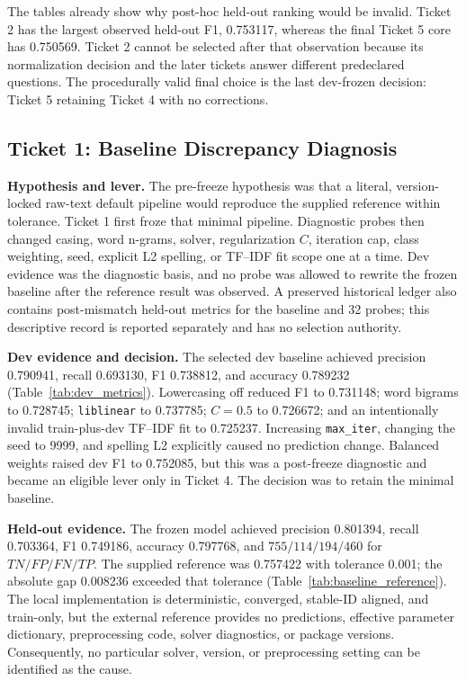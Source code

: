 \documentclass[conference]{IEEEtran}
\begin{document}
The tables already show why post-hoc held-out ranking would be invalid. Ticket 2 has the largest observed held-out F1, 0.753117, whereas the final Ticket 5 core has 0.750569. Ticket 2 cannot be selected after that observation because its normalization decision and the later tickets answer different predeclared questions. The procedurally valid final choice is the last dev-frozen decision: Ticket 5 retaining Ticket 4 with no corrections.

\subsection{Ticket 1: Baseline Discrepancy Diagnosis}

\textbf{Hypothesis and lever.} The pre-freeze hypothesis was that a literal, version-locked raw-text default pipeline would reproduce the supplied reference within tolerance. Ticket 1 first froze that minimal pipeline. Diagnostic probes then changed casing, word n-grams, solver, regularization $C$, iteration cap, class weighting, seed, explicit L2 spelling, or TF--IDF fit scope one at a time. Dev evidence was the diagnostic basis, and no probe was allowed to rewrite the frozen baseline after the reference result was observed. A preserved historical ledger also contains post-mismatch held-out metrics for the baseline and 32 probes; this descriptive record is reported separately and has no selection authority.

\textbf{Dev evidence and decision.} The selected dev baseline achieved precision 0.790941, recall 0.693130, F1 0.738812, and accuracy 0.789232 (Table~\ref{tab:dev_metrics}). Lowercasing off reduced F1 to 0.731148; word bigrams to 0.728745; \texttt{liblinear} to 0.737785; $C=0.5$ to 0.726672; and an intentionally invalid train-plus-dev TF--IDF fit to 0.725237. Increasing \texttt{max\_iter}, changing the seed to 9999, and spelling L2 explicitly caused no prediction change. Balanced weights raised dev F1 to 0.752085, but this was a post-freeze diagnostic and became an eligible lever only in Ticket 4. The decision was to retain the minimal baseline.

\textbf{Held-out evidence.} The frozen model achieved precision 0.801394, recall 0.703364, F1 0.749186, accuracy 0.797768, and $755/114/194/460$ for $TN/FP/FN/TP$. The supplied reference was 0.757422 with tolerance 0.001; the absolute gap 0.008236 exceeded that tolerance (Table~\ref{tab:baseline_reference}). The local implementation is deterministic, converged, stable-ID aligned, and train-only, but the external reference provides no predictions, effective parameter dictionary, preprocessing code, solver diagnostics, or package versions. Consequently, no particular solver, version, or preprocessing setting can be identified as the cause.
\end{document}
